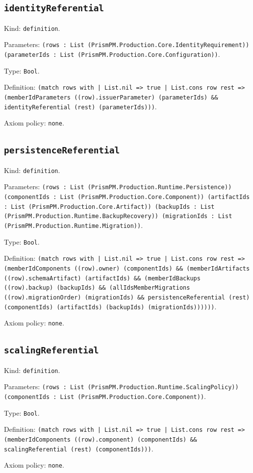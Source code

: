 \documentclass[11pt]{article}
\begin{document}
\subsection*{\texttt{identityReferential}}
\noindent Kind: \texttt{definition}.\par
\noindent Parameters: \texttt{(rows : List (PrismPM.Production.Core.IdentityRequirement)) (parameterIds : List (PrismPM.Production.Core.Configuration))}.\par
\noindent Type: \texttt{Bool}.\par
\noindent Definition: \texttt{(match rows with | List.nil => true | List.cons row rest => (memberIdParameters ((row).issuerParameter) (parameterIds) \&\& identityReferential (rest) (parameterIds)))}.\par
\noindent Axiom policy: \texttt{none}.\par
\subsection*{\texttt{persistenceReferential}}
\noindent Kind: \texttt{definition}.\par
\noindent Parameters: \texttt{(rows : List (PrismPM.Production.Runtime.Persistence)) (componentIds : List (PrismPM.Production.Core.Component)) (artifactIds : List (PrismPM.Production.Core.Artifact)) (backupIds : List (PrismPM.Production.Runtime.BackupRecovery)) (migrationIds : List (PrismPM.Production.Runtime.Migration))}.\par
\noindent Type: \texttt{Bool}.\par
\noindent Definition: \texttt{(match rows with | List.nil => true | List.cons row rest => (memberIdComponents ((row).owner) (componentIds) \&\& (memberIdArtifacts ((row).schemaArtifact) (artifactIds) \&\& (memberIdBackups ((row).backup) (backupIds) \&\& (allIdsMemberMigrations ((row).migrationOrder) (migrationIds) \&\& persistenceReferential (rest) (componentIds) (artifactIds) (backupIds) (migrationIds))))))}.\par
\noindent Axiom policy: \texttt{none}.\par
\subsection*{\texttt{scalingReferential}}
\noindent Kind: \texttt{definition}.\par
\noindent Parameters: \texttt{(rows : List (PrismPM.Production.Runtime.ScalingPolicy)) (componentIds : List (PrismPM.Production.Core.Component))}.\par
\noindent Type: \texttt{Bool}.\par
\noindent Definition: \texttt{(match rows with | List.nil => true | List.cons row rest => (memberIdComponents ((row).component) (componentIds) \&\& scalingReferential (rest) (componentIds)))}.\par
\noindent Axiom policy: \texttt{none}.\par
\end{document}
